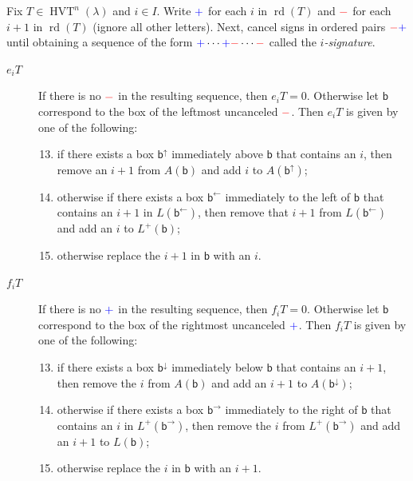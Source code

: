 \documentclass[ALCO,ThmDefs,Unicode,epreuves]{cedram}
\newcommand{\bbb}{\mathsf{b}}
\DeclareMathOperator{\rd}{rd} %
\DeclareMathOperator{\hvt}{HVT} %
\newcommand{\bplus}{{\color{blue}+}}
\newcommand{\bminus}{{\color{red}-}}
\newcommand{\defn}[1]{{\color{darkred}\emph{#1}}} %
\begin{document}
\begin{defi}
\label{defn:hvt_crystal_ops}
Fix $T \in \hvt^n(\lambda)$ and $i \in I$.
Write $\bplus$ for each $i$ in $\rd(T)$ and $\bminus$ for each $i+1$ in $\rd(T)$ (ignore all other letters). 
Next, cancel signs in ordered pairs $\bminus \bplus$ until obtaining a sequence of the form $\bplus \cdots \bplus \bminus \cdots \bminus$ called the \defn{$i$-signature}.
\begin{description}
\item[\defn{$e_i T$}] If there is no $\bminus$ in the resulting sequence, then $e_i T = 0$. Otherwise let $\bbb$ correspond to the box of the leftmost uncanceled $\bminus$. Then $e_i T$ is given by one of the following:
\begin{enumerate}[(\Alph*)]
\setcounter{enumi}{12}
\item\label{def4.3_1M} %
if there exists a box $\bbb^{\uparrow}$ immediately above $\bbb$ that contains an $i$, then remove an $i + 1$ from $A(\bbb)$ and add $i$ to $A(\bbb^{\uparrow})$;
\setcounter{enumi}{18}
\item\label{def4.3_1S} %
otherwise if there exists a box $\bbb^{\leftarrow}$ immediately to the left of $\bbb$ that contains an $i+1$ in $L(\bbb^{\leftarrow})$, then remove that $i+1$ from $L(\bbb^{\leftarrow})$ and add an $i$ to $L^+(\bbb)$;
\setcounter{enumi}{13}
\item\label{def4.3_1N} %
otherwise replace the $i+1$ in $\bbb$ with an $i$.
\end{enumerate}

\item[\defn{$f_i T$}] If there is no $\bplus$ in the resulting sequence, then $f_i T = 0$. Otherwise let $\bbb$ correspond to the box of the rightmost uncanceled $\bplus$. Then $f_i T$ is given by one of the following:
\begin{enumerate}[(\Alph*)]
\setcounter{enumi}{12}
\item\label{def4.3_2M} %
if there exists a box $\bbb^{\downarrow}$ immediately below $\bbb$ that contains an $i+1$, then remove the $i$ from $A(\bbb)$ and add an $i+1$ to $A(\bbb^{\downarrow})$;
\setcounter{enumi}{18}
\item\label{def4.3_2S} %
otherwise if there exists a box $\bbb^{\rightarrow}$ immediately to the right of $\bbb$ that contains an $i$ in $L^+(\bbb^{\rightarrow})$, then remove the $i$ from $L^+(\bbb^{\rightarrow})$ and add an $i+1$ to $L(\bbb)$;
\setcounter{enumi}{13}
\item\label{def4.3_2N} %
otherwise replace the $i$ in $\bbb$ with an $i+1$.
\end{enumerate}
\end{description}
\end{defi}
\end{document}
